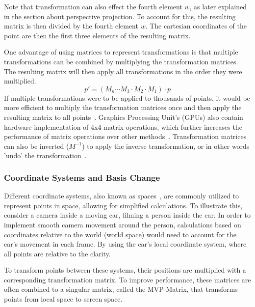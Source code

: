 Note that transformation can also effect the fourth element $w$, as later explained in the section about perspective projection.
To account for this, the resulting matrix is then divided by the fourth element $w$.
The cartesian coordinates of the point are then the first three elements of the resulting matrix.

One advantage of using matrices to represent transformations is that multiple transformations can be combined by
multiplying the transformation matrices.
The resulting matrix will then apply all transformations in the order they were multiplied.
\begin{equation}
    p' = (M_n \cdots M_3 \cdot M_2 \cdot M_1) \cdot p
\end{equation}
If multiple transformations were to be applied to thousands of points,
it would be more efficient to multiply the transformation matrices once and then apply the resulting matrix to all points~\cite{de_vries_learn_2020}.
Graphics Processing Unit's (GPUs) also contain hardware implementation of 4x4 matrix operations,
which further increases the performance of matrix operations over other methods~\cite{dorner_virtual_2019}.
Transformation matrices can also be inverted ($M^{-1}$) to apply the inverse transformation, or in other words 'undo' the transformation~\cite{dorner_virtual_2019}.

\subsubsection{Coordinate Systems and Basis Change}

Different coordinate systems, also known as spaces~\cite{de_vries_learn_2020}, are commonly utilized to represent points
in space, allowing for simplified calculations.
To illustrate this, consider a camera inside a moving car, filming a person inside the car.
In order to implement smooth camera movement around the person,
calculations based on coordinates relative to the world (world space) would need to account for the car's movement in each frame.
By using the car's local coordinate system, where all points are relative to the clarity.~\cite{de_vries_learn_2020}

To transform points between these systems, their positions are multiplied with a corresponding transformation matrix.
To improve performance, these matrices are often combined to a singular matrix, called the MVP-Matrix,
that transforms points from local space to screen space. \cite{de_vries_learn_2020}

